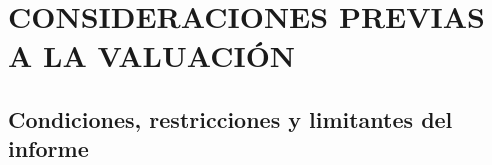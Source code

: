 \section{CONSIDERACIONES PREVIAS A LA VALUACI\'ON}\label{sec:j}

	\subsection{Condiciones, restricciones y limitantes del informe}
	